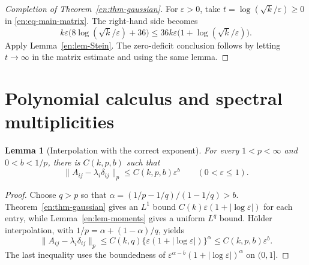 \documentclass[12pt]{amsart}
\newtheorem{lem}[thm]{Lemma}
\theoremstyle{definition}
\theoremstyle{remark}
\numberwithin{equation}{section}
\theoremstyle{jpplain}
\begin{document}
\begin{proof}[Completion of Theorem~\ref{en:thm-gaussian}]
For $\varepsilon>0$, take $t=\log(\sqrt{k}/\varepsilon)\geq0$ in
\eqref{en:eq-main-matrix}.  The right-hand side becomes
\[
 k\varepsilon\bigl(8\log(\sqrt{k}/\varepsilon)+36\bigr)
 \leq36k\varepsilon\bigl(1+\log(\sqrt{k}/\varepsilon)\bigr).
\]
Apply Lemma~\ref{en:lem-Stein}.  The zero-deficit conclusion follows by
letting $t\to\infty$ in the matrix estimate and using the same lemma.
\end{proof}

\section{Polynomial calculus and spectral multiplicities}

\begin{lem}[Interpolation with the correct exponent]\label{en:lem-interp}
For every $1<p<\infty$ and $0<b<1/p$, there is $C(k,p,b)$ such that
\begin{equation}\label{en:eq-Lp}
 \|A_{ij}-\lambda_i\delta_{ij}\|_p\leq C(k,p,b)\varepsilon^b
 \qquad(0<\varepsilon\leq1).
\end{equation}
\end{lem}
\begin{proof}
Choose $q>p$ so that
$\alpha=(1/p-1/q)/(1-1/q)>b$.  Theorem~\ref{en:thm-gaussian} gives an
$L^1$ bound $C(k)\varepsilon(1+|\log\varepsilon|)$ for each entry, while
Lemma~\ref{en:lem-moments} gives a uniform $L^q$ bound.  Hölder
interpolation, with $1/p=\alpha+(1-\alpha)/q$, yields
\[
 \|A_{ij}-\lambda_i\delta_{ij}\|_p
 \leq C(k,q)\{\varepsilon(1+|\log\varepsilon|)\}^{\alpha}
 \leq C(k,p,b)\varepsilon^b.
\]
The last inequality uses the boundedness of
$\varepsilon^{\alpha-b}(1+|\log\varepsilon|)^\alpha$ on $(0,1]$.
\end{proof}
\end{document}
